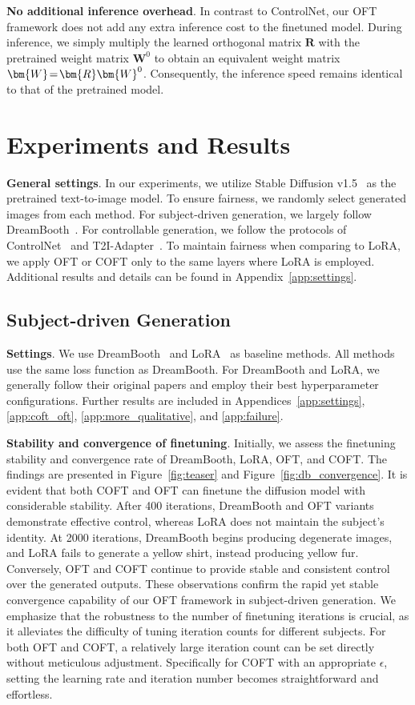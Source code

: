 \textbf{No additional inference overhead}. In contrast to ControlNet, our OFT framework does not add any extra inference cost to the finetuned model. During inference, we simply multiply the learned orthogonal matrix $\bm{R}$ with the pretrained weight matrix $\bm{W}^0$ to obtain an equivalent weight matrix $\thickmuskip=2mu \medmuskip=2mu \bm{W}=\bm{R}\bm{W}^0$. Consequently, the inference speed remains identical to that of the pretrained model.

\section{Experiments and Results}

\textbf{General settings}. In our experiments, we utilize Stable Diffusion v1.5~\cite{rombach2022high} as the pretrained text-to-image model. To ensure fairness, we randomly select generated images from each method. For subject-driven generation, we largely follow DreamBooth~\cite{ruiz2023dreambooth}. For controllable generation, we follow the protocols of ControlNet~\cite{zhang2023adding} and T2I-Adapter~\cite{mou2023t2i}. To maintain fairness when comparing to LoRA, we apply OFT or COFT only to the same layers where LoRA is employed. Additional results and details can be found in Appendix~\ref{app:settings}.

\subsection{Subject-driven Generation}

\textbf{Settings}. We use DreamBooth~\cite{ruiz2023dreambooth} and LoRA~\cite{hulora2022} as baseline methods. All methods use the same loss function as DreamBooth. For DreamBooth and LoRA, we generally follow their original papers and employ their best hyperparameter configurations. Further results are included in Appendices~\ref{app:settings}, \ref{app:coft_oft}, \ref{app:more_qualitative}, and \ref{app:failure}.

\textbf{Stability and convergence of finetuning}. Initially, we assess the finetuning stability and convergence rate of DreamBooth, LoRA, OFT, and COFT. The findings are presented in Figure~\ref{fig:teaser} and Figure~\ref{fig:db_convergence}. It is evident that both COFT and OFT can finetune the diffusion model with considerable stability. After 400 iterations, DreamBooth and OFT variants demonstrate effective control, whereas LoRA does not maintain the subject’s identity. At 2000 iterations, DreamBooth begins producing degenerate images, and LoRA fails to generate a yellow shirt, instead producing yellow fur. Conversely, OFT and COFT continue to provide stable and consistent control over the generated outputs. These observations confirm the rapid yet stable convergence capability of our OFT framework in subject-driven generation. We emphasize that the robustness to the number of finetuning iterations is crucial, as it alleviates the difficulty of tuning iteration counts for different subjects. For both OFT and COFT, a relatively large iteration count can be set directly without meticulous adjustment. Specifically for COFT with an appropriate $\epsilon$, setting the learning rate and iteration number becomes straightforward and effortless.

